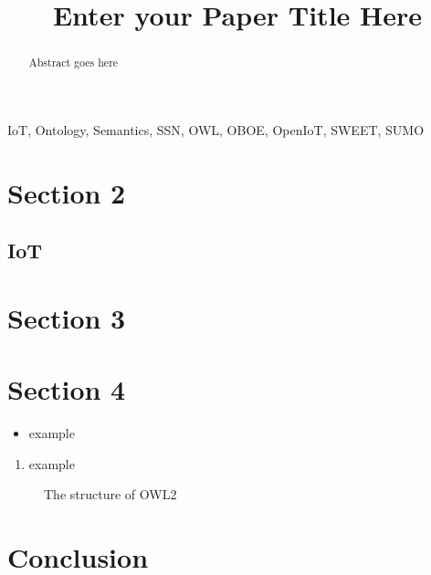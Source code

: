 \documentclass[conference]{IEEEtran}
\begin{document}
	\title{Enter your Paper Title Here}
	\author
	{
	}
	\maketitle
	\begin{abstract}
		Abstract goes here
	\end{abstract}
	\begin {IEEEkeywords}
		IoT, Ontology, Semantics,  SSN, OWL, OBOE, OpenIoT, SWEET, SUMO
	\end{IEEEkeywords}
	
	\section{Section 2}\label{section2}
%
	\subsection{IoT}
\section{Section 3}
\label{section3}
%


\section{Section 4}
\label{section4}
%


\begin{itemize}
\item example
\end {itemize}



    \begin{enumerate}
    \item example

    \end{enumerate}




\begin{figure}[h]
   \centering
    \caption{The structure of OWL2}
    \label{fig:OWL2}
\end{figure}



\section{Conclusion}
\label {conclusion}
%


	
	
\end{document}
